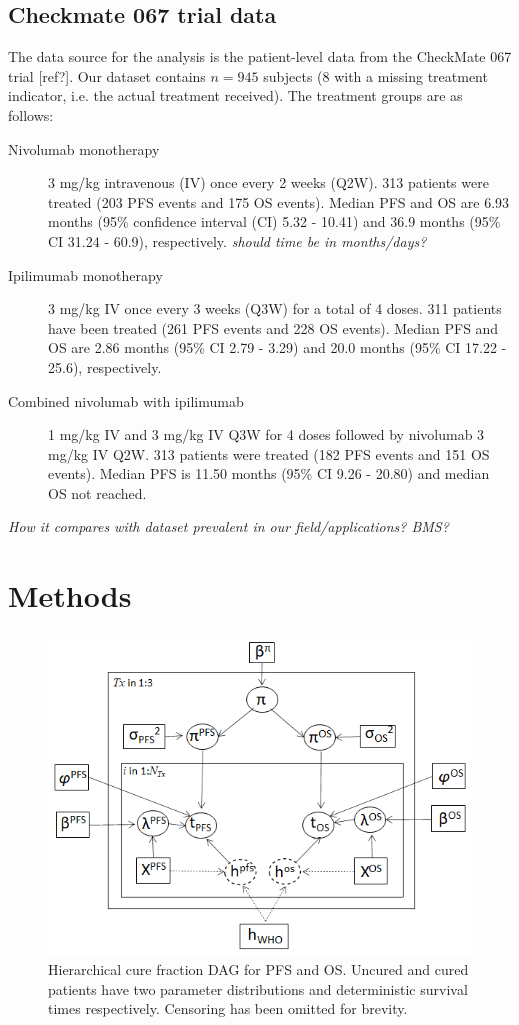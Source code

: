 \documentclass[AMA,STIX1COL]{WileyNJD-v2}
\begin{document}
\subsection{Checkmate 067 trial data}
The data source for the analysis is the patient-level data from the CheckMate 067 trial [ref?].
Our dataset contains $n = 945$ subjects (8 with a missing treatment indicator, i.e. the actual treatment received).
The treatment groups are as  follows:
\begin{description}
\item[Nivolumab monotherapy] 3 mg/kg intravenous (IV) once every 2 weeks (Q2W). 313 patients were treated (203 PFS events and 175 OS events).
Median PFS and OS are 6.93 months (95\% confidence interval (CI) 5.32 - 10.41) and 36.9 months (95\% CI 31.24 - 60.9), respectively. {\it should time be in months/days?}
\item[Ipilimumab monotherapy] 3 mg/kg IV once every 3 weeks (Q3W) for a total of 4 doses.
311 patients have been treated (261 PFS events and 228 OS events). Median PFS and OS are 2.86 months (95\% CI 2.79 - 3.29) and 20.0 months (95\% CI 17.22 - 25.6), respectively.
\item[Combined nivolumab with ipilimumab] 1 mg/kg IV and 3 mg/kg IV Q3W for 4 doses followed by nivolumab 3 mg/kg IV Q2W.
313 patients were treated (182 PFS events and 151 OS events). Median PFS is 11.50 months (95\% CI 9.26 - 20.80) and median OS not reached. 
\end{description}


{\it How it compares with dataset prevalent in our field/applications? BMS?}

%
\section{Methods}\label{sec:methods}

\begin{figure}
\centering
\includegraphics[width=0.6\linewidth]{DAG_with_Tx.png}
\caption{\label{fig:hier_dag} Hierarchical cure fraction DAG for PFS and OS.
Uncured and cured patients have two parameter distributions and deterministic survival times respectively. Censoring has been omitted for brevity.}
\end{figure}
\end{document}
